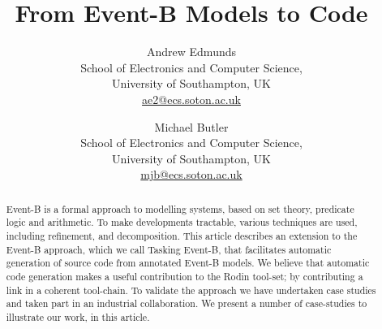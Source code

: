 \documentclass{easychair}
\begin{document}
%
\title{From Event-B Models to Code}

%


%

\author{Andrew Edmunds\\
School of Electronics and Computer Science,\\
University of Southampton, UK\\
\url{ae2@ecs.soton.ac.uk}\\
\and
Michael Butler\\
School of Electronics and Computer Science,\\
University of Southampton, UK\\
\url{mjb@ecs.soton.ac.uk}\\
}

%


\maketitle

%
\begin{abstract}
Event-B is a formal approach to modelling systems, based on set theory, predicate logic and arithmetic. To make developments tractable, various techniques are used, including refinement, and decomposition. This article describes an extension to the Event-B approach, which we call Tasking Event-B, that facilitates automatic generation of source code from annotated Event-B models. We believe that automatic code generation makes a useful contribution to the Rodin tool-set; by contributing a link in a coherent tool-chain. To validate the approach we have undertaken case studies and taken part in an industrial collaboration. We present a number of case-studies to illustrate our work, in this article.
\end{abstract}
\end{document}

